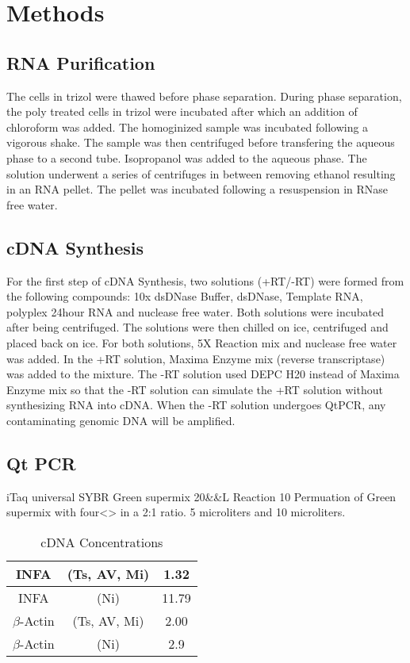 \documentclass[journal, a4paper]{IEEEtran}
\begin{document}
\section{Methods}
    \subsection{RNA Purification}
      The cells in trizol were thawed before phase separation. During phase separation,
      the poly treated cells in trizol were incubated after which an addition of chloroform was added.
      The homoginized sample was incubated following a vigorous shake. The sample was then centrifuged before transfering the aqueous phase
      to a second tube. Isopropanol was added to the aqueous phase. The solution underwent a series of centrifuges in between removing ethanol
      resulting in an RNA pellet. The pellet was incubated following a resuspension in RNase free water.

    \subsection{cDNA Synthesis}
      For the first step of cDNA Synthesis, two solutions (+RT/-RT) were formed from the following compounds:
      10x dsDNase Buffer, dsDNase, Template RNA, polyplex 24hour RNA and nuclease free water.
      Both solutions were incubated after being centrifuged. The solutions were then chilled on ice, centrifuged and placed back on ice.
      For both solutions, 5X Reaction mix and nuclease free water was added. In the +RT solution, Maxima Enzyme mix (reverse transcriptase) was added to the mixture.
      The -RT solution used DEPC H20 instead of Maxima Enzyme mix so that the -RT solution can simulate the +RT solution without synthesizing RNA into cDNA.
      When the -RT solution undergoes QtPCR, any contaminating genomic DNA will be amplified.

    \subsection{Qt PCR}

      iTaq universal SYBR Green supermix 20&\mu&L Reaction
      10
      Permuation of Green supermix with four<> in a 2:1 ratio.
      5 microliters and 10 microliters.

      \begin{table}[!hbt]
        \begin{center}
        \caption{cDNA Concentrations}
        \label{tab:simParameters}
        \begin{tabular}{|c|c|c|}
          \hline
          INFA & (Ts, AV, Mi) & 1.32 \\
          \hline
          INFA & (Ni) & 11.79 \\
          \hline
          $\beta$-Actin & (Ts, AV, Mi) & 2.00 \\
          \hline
          $\beta$-Actin & (Ni) & 2.9 \\
          \hline
        \end{tabular}
        \end{center}
      \end{table}
\end{document}
